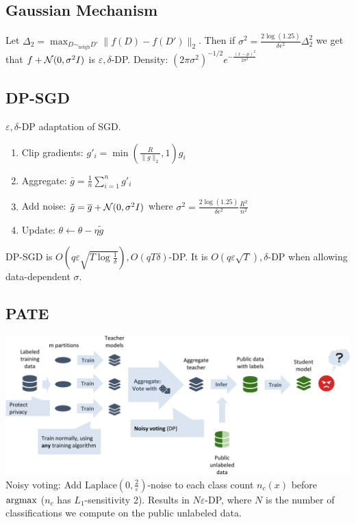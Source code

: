 \subsection*{Gaussian Mechanism}
Let $\Delta_2=\max_{D\sim_{\text{neigh}}D'}\|f(D)-f(D')\|_{{2}}$. Then if $\sigma^2=\frac{2\log(1.25)}{\delta\epsilon^2}\Delta_2^2$ we get that $f+\mathcal{N}(0,\sigma^2I)$ is $\varepsilon,\delta$-DP.
Density: $({{2\pi\sigma^2}})^{-1/2}e^{-\frac{(x-\mu)^2}{2\sigma^2}}$

\subsection*{DP-SGD}
$\varepsilon,\delta$-DP adaptation of SGD.
\begin{enumerate}
    \item Clip gradients: ${g}'_i=\min\left(\frac{R}{\|{g}\|_2},1\right){g_i}$
    \item Aggregate: $\bar{g}=\frac{1}{n}\sum_{i=1}^n {g}'_i$
    \item Add noise: $\tilde{g}=\overline{g}+\mathcal{N}(0,\sigma^2I)$ where $\sigma^2=\frac{2\log(1.25)}{\delta \epsilon^2}\frac{R^2}{n^2}$
    \item Update: $\theta\leftarrow \theta-\eta\tilde{g}$
\end{enumerate}
DP-SGD is $O\left(q\varepsilon\sqrt{T\log{\frac{1}{\delta}}}\right),O(qT\delta)$-DP. It is $O(q\varepsilon\sqrt{T}),\delta$-DP when allowing data-dependent $\sigma$.

\subsection*{PATE}
\includegraphics[width=\columnwidth]{img/pate.png}
Noisy voting: Add $\text{Laplace}(0,\frac{2}{\varepsilon})$-noise to each class count $n_c(x)$ before $\operatorname{\operatorname{argmax}}$ ($n_c$ has $L_1$-sensitivity 2). Results in $N\varepsilon$-DP, where $N$ is the number of classifications we compute on the public unlabeled data.
